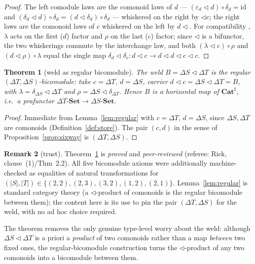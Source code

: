 \documentclass[11pt]{amsart}
\theoremstyle{plain}
\newtheorem{theorem}{Theorem}[section]
\theoremstyle{definition}
\newtheorem{remark}[theorem]{Remark}
\newcommand{\Cathash}{\mathbf{Cat}^{\sharp}}
\newcommand{\Set}{\mathbf{Set}}
\renewcommand{\lhd}{\triangleleft}
\newcommand{\Store}[1]{\Delta #1}
\begin{document}
\begin{proof}
The left comodule laws \cite[(34)]{SGF} are the comonoid laws of $d$ ---
$(\varepsilon_d\lhd d)\circ\delta_d=\mathrm{id}$ and
$(\delta_d\lhd d)\circ\delta_d=(d\lhd\delta_d)\circ\delta_d$ --- whiskered on the right by
$\lhd c$; the right laws \cite[(35)]{SGF} are the comonoid laws of $c$ whiskered on the left
by $d\lhd$. For compatibility \cite[(36)]{SGF}, $\lambda$ acts on the first ($d$) factor and
$\rho$ on the last ($c$) factor; since $\lhd$ is a bifunctor, the two whiskerings commute by
the interchange law, and both $(\lambda\lhd c)\circ\rho$ and $(d\lhd\rho)\circ\lambda$ equal
the single map $\delta_d\lhd\delta_c\colon d\lhd c\to d\lhd d\lhd c\lhd c$.
\end{proof}

\begin{theorem}[weld as regular bicomodule]\label{thm:weld-regular}
The weld $B=\Store{S}\lhd\Store{T}$ is the regular $(\Store{T},\Store{S})$-bicomodule: take
$c=\Store{T}$, $d=\Store{S}$, carrier $d\lhd c=\Store{S}\lhd\Store{T}=B$, with
$\lambda=\delta_{\Store{S}}\lhd\Store{T}$ and $\rho=\Store{S}\lhd\delta_{\Store{T}}$. Hence
$B$ is a horizontal map of $\Cathash$, i.e.\ a prafunctor $\Store{T}\text{-}\Set\to
\Store{S}\text{-}\Set$.
\end{theorem}

\begin{proof}
Immediate from Lemma~\ref{lem:regular} with $c=\Store{T}$, $d=\Store{S}$, since
$\Store{S},\Store{T}$ are comonoids (Definition~\ref{def:store}). The pair $(c,d)$ in the
sense of Proposition~\ref{prop:sixway} is $(\Store{T},\Store{S})$.
\end{proof}

\begin{remark}[trust]\label{rem:trust-weld}
Theorem~\ref{thm:weld-regular} is \emph{proved} and \emph{peer-reviewed} (referee: Rick,
clause~(1)/Thm~2.2). All five bicomodule axioms were additionally machine-checked as
equalities of natural transformations for
$(|S|,|T|)\in\{(2,2),(2,3),(3,2),(1,2),(2,1)\}$. Lemma~\ref{lem:regular} is standard
category theory (a $\lhd$-product of comonoids is the regular bicomodule between them); the
content here is its use to pin the pair $(\Store{T},\Store{S})$ for the weld, with no
ad hoc choice required.
\end{remark}

The theorem removes the only genuine type-level worry about the weld: although
$\Store{S}\lhd\Store{T}$ is a priori a \emph{product} of two comonoids rather than a map
\emph{between} two fixed ones, the regular-bicomodule construction turns the $\lhd$-product
of any two comonoids into a bicomodule between them.
\end{document}
